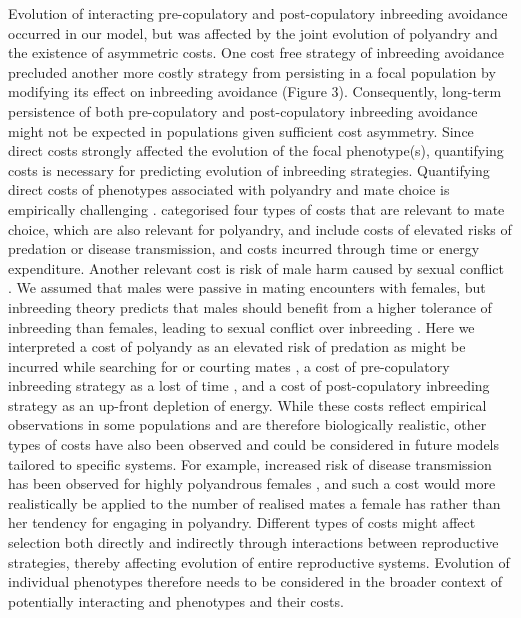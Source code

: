 \documentclass[10pt,letterpaper]{article}
\begin{document}
Evolution of interacting pre-copulatory and post-copulatory inbreeding avoidance occurred in our model, but was affected by the joint evolution of polyandry and the existence of asymmetric costs. One cost free strategy of inbreeding avoidance precluded another more costly strategy from persisting in a focal population by modifying its effect on inbreeding avoidance (Figure 3). Consequently, long-term persistence of both pre-copulatory and post-copulatory inbreeding avoidance might not be expected in populations given sufficient cost asymmetry. Since direct costs strongly affected the evolution of the focal phenotype(s), quantifying costs is necessary for predicting evolution of inbreeding strategies. Quantifying direct costs of phenotypes associated with polyandry and mate choice is empirically challenging \cite[][]{Pomiankowski1987, Kokko2003}. \cite{Pomiankowski1987} categorised four types of costs that are relevant to mate choice, which are also relevant for polyandry, and include costs of elevated risks of predation or disease transmission, and costs incurred through time or energy expenditure. Another relevant cost is risk of male harm caused by sexual conflict \cite[e.g.,][]{Arnqvist2005a, Parker2006}. We assumed that males were passive in mating encounters with females, but inbreeding theory predicts that males should benefit from a higher tolerance of inbreeding than females, leading to sexual conflict over inbreeding \cite[][]{Parker1979, Parker2006, Kokko2006, Duthie2015a}. Here we interpreted a cost of polyandy as an elevated risk of predation as might be incurred while searching for or courting mates \cite[e.g.,][]{Rowe1988, Rowe1994}, a cost of pre-copulatory inbreeding strategy as a lost of time \cite[i.e., risk of not finding a mate in time due to choosiness; e.g.,][]{Kokko2013}, and a cost of post-copulatory inbreeding strategy as an up-front depletion of energy. While these costs reflect empirical observations in some populations and are therefore biologically realistic, other types of costs have also been observed and could be considered in future models tailored to specific systems. For example, increased risk of disease transmission has been observed for highly polyandrous females \cite[][]{Roberts2015a}, and such a cost would more realistically be applied to the number of realised mates a female has rather than her tendency for engaging in polyandry. Different types of costs might affect selection both directly and indirectly through interactions between reproductive strategies, thereby affecting evolution of entire reproductive systems. Evolution of individual phenotypes therefore needs to be considered in the broader context of potentially interacting and phenotypes and their costs.
\end{document}
